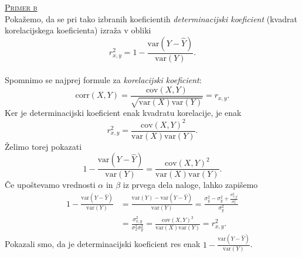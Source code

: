 \documentclass[a4paper,12pt]{article}
\begin{document}
\noindent
\textsc{\underline{Primer b}}
\\
Pokažemo, da se pri tako izbranih koeficientih \textit{determinacijski koeficient} (kvadrat korelacijskega koeficienta) izraža v obliki
$$ r_{x,y}^2 = 1 - \frac{\text{var}(Y - \hat{Y})}{\text{var}(Y)}. $$
\\
Spomnimo se najprej formule za \textit{korelacijski koeficient}: 
$$ \text{corr}(X,Y) = \frac{\text{cov}(X,Y)}{\sqrt{\text{var}(X) \text{var}(Y)}} = r_{x,y}. $$
Ker je determinacijski koeficient enak kvadratu korelacije, je enak
$$ r_{x,y}^2 = \frac{\text{cov}(X,Y)^2}{\text{var}(X) \text{var}(Y)}. $$
Želimo torej pokazati
$$ 1 - \frac{\text{var}(Y - \hat{Y})}{\text{var}(Y)} = \frac{\text{cov}(X,Y)^2}{\text{var}(X) \text{var}(Y)}. $$
Če upoštevamo vrednosti $\alpha$ in $\beta$ iz prvega dela naloge, lahko zapišemo
\begin{align*} 
    1 - \frac{\text{var}(Y - \hat{Y})}{\text{var}(Y)} &= \frac{\text{var}(Y) - \text{var}(Y - \hat{Y})}{\text{var}(Y)} = \frac{\sigma_y^2 - \sigma_y^2 + \frac{\sigma_{x,y}^2}{\sigma_x^2}}{\sigma_y^2} 
    \\
    &= \frac{\sigma_{x,y}^2}{\sigma_x^2 \sigma_y^2} = \frac{\text{cov}(X,Y)^2}{\text{var}(X) \text{var}(Y)} = r_{x,y}^2. 
\end{align*}
Pokazali smo, da je determinacijski koeficient res enak $1 - \frac{\text{var}(Y - \hat{Y})}{\text{var}(Y)}$.
\end{document}
